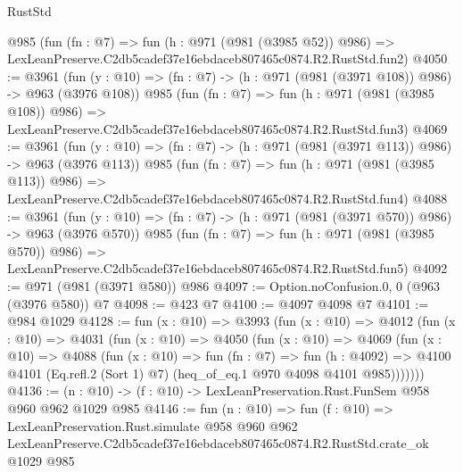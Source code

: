 \begin{lexlean}{RustStd}
\begin{coremodule}
    @985
    (fun (fn : @7) =>
    fun (h : @971 (@981 (@3985 @52)) @986) =>
    LexLeanPreserve.C2db5cadef37e16ebdaceb807465c0874.R2.RustStd.fun2)
@4050 := @3961
    (fun (y : @10) => (fn : @7) -> (h : @971 (@981 (@3971 @108)) @986) -> @963 (@3976 @108))
    @985
    (fun (fn : @7) =>
    fun (h : @971 (@981 (@3985 @108)) @986) =>
    LexLeanPreserve.C2db5cadef37e16ebdaceb807465c0874.R2.RustStd.fun3)
@4069 := @3961
    (fun (y : @10) => (fn : @7) -> (h : @971 (@981 (@3971 @113)) @986) -> @963 (@3976 @113))
    @985
    (fun (fn : @7) =>
    fun (h : @971 (@981 (@3985 @113)) @986) =>
    LexLeanPreserve.C2db5cadef37e16ebdaceb807465c0874.R2.RustStd.fun4)
@4088 := @3961
    (fun (y : @10) => (fn : @7) -> (h : @971 (@981 (@3971 @570)) @986) -> @963 (@3976 @570))
    @985
    (fun (fn : @7) =>
    fun (h : @971 (@981 (@3985 @570)) @986) =>
    LexLeanPreserve.C2db5cadef37e16ebdaceb807465c0874.R2.RustStd.fun5)
@4092 := @971 (@981 (@3971 @580)) @986
@4097 := Option.noConfusion.{0, 0} (@963 (@3976 @580)) @7
@4098 := @423 @7
@4100 := @4097 @4098 @7
@4101 := @984 @1029
@4128 := fun (x : @10) =>
  @3993
    (fun (x : @10) =>
    @4012
      (fun (x : @10) =>
      @4031
        (fun (x : @10) =>
        @4050
          (fun (x : @10) =>
          @4069
            (fun (x : @10) =>
            @4088
              (fun (x : @10) =>
              fun (fn : @7) =>
              fun (h : @4092) =>
              @4100 @4101 (Eq.refl.{2} (Sort 1) @7) (heq_of_eq.{1} @970 @4098 @4101 @985)))))))
@4136 := (n : @10) -> (f : @10) -> LexLeanPreservation.Rust.FunSem @958 @960 @962 @1029 @985
@4146 := fun (n : @10) =>
  fun (f : @10) =>
  LexLeanPreservation.Rust.simulate
    @958
    @960
    @962
    LexLeanPreserve.C2db5cadef37e16ebdaceb807465c0874.R2.RustStd.crate_ok
    @1029
    @985
\end{coremodule}
\end{lexlean}
